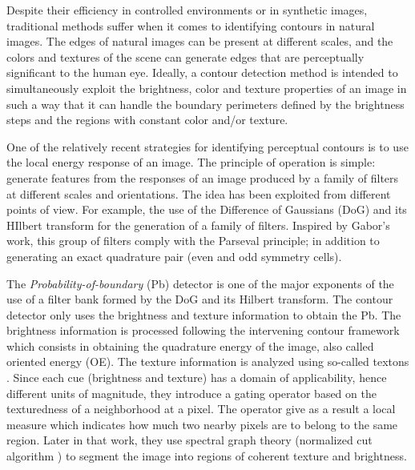 Despite their efficiency in controlled environments or in synthetic images, traditional methods suffer when it comes to identifying contours in natural images. The edges of natural images can be present at different scales, and the colors and textures of the scene can generate edges that are perceptually significant to the human eye. Ideally, a contour detection method is intended to simultaneously exploit the brightness, color and texture properties of an image in such a way that it can handle the boundary perimeters defined by the brightness steps and the regions with constant color and/or texture.

One of the relatively recent strategies for identifying perceptual contours is to use the local energy response of an image. The principle of operation is simple: generate features from the responses of an image produced by a family of filters at different scales and orientations. The idea has been exploited from different points of view. For example, the use of the  Difference of Gaussians (DoG) and its HIlbert transform \citep{Morrone.Owens:PR:1987, Morrone.Burr.ea:RSL:1988} for the generation of a family of filters. Inspired by Gabor's work, this group of filters comply with the Parseval principle; in addition to generating an exact quadrature pair (even and odd symmetry cells).

The \textit{Probability-of-boundary} (Pb) detector \citep{Malik.Belongie.ea:IJCV:2001} is one of the major exponents of the use of a filter bank formed by the DoG and its Hilbert transform. The contour detector only uses the brightness and texture information to obtain the Pb. The brightness information is processed following the intervening contour framework \citep{Leung.Malik:ECCV:1998} which consists in obtaining the quadrature energy of the image, also called oriented energy (OE). The texture information is analyzed using so-called textons \citep{Malik.Belongie.ea:ICCV:1999}. Since each cue (brightness and texture) has a domain of applicability, hence different units of magnitude, they introduce a gating operator based on the texturedness of a neighborhood at a pixel. The operator give as a result a local measure which indicates how much two nearby pixels are to belong to the same region. Later in that work, they use spectral graph theory (normalized cut algorithm \citep{JianboShi.Malik:PAMI:2000}) to segment the image into regions of coherent texture and brightness.


